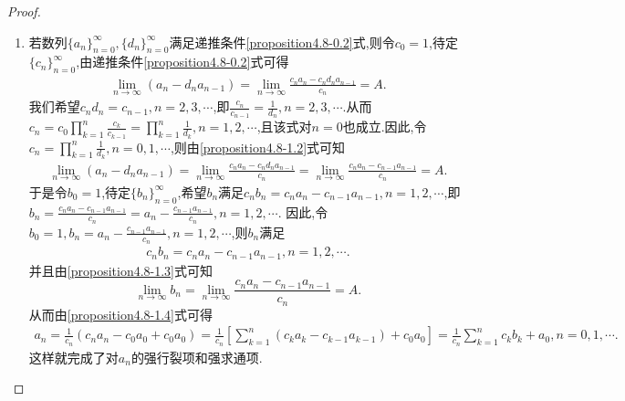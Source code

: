 \documentclass[../../main.tex]{subfiles}%
\begin{document}
\begin{proof}
\begin{enumerate}[(1)]
\item 若数列\(\{ a_n \}_{n = 0}^{\infty}, \{ d_n \}_{n = 0}^{\infty}\)满足递推条件\eqref{proposition4.8-0.2}式,则令\(c_0 = 1\),待定\(\{ c_n \}_{n = 0}^{\infty}\),由递推条件\eqref{proposition4.8-0.2}式可得
\begin{align}\label{proposition4.8-1.2}
\lim_{n\rightarrow \infty}(a_n - d_na_{n - 1}) = \lim_{n\rightarrow \infty}\frac{c_na_n - c_nd_na_{n - 1}}{c_n} = A. 
\end{align}
我们希望\(c_nd_n = c_{n - 1}, n = 2, 3, \cdots\),即\(\frac{c_n}{c_{n - 1}} = \frac{1}{d_n}, n = 2, 3, \cdots\).从而\(c_n = c_0\prod_{k = 1}^n{\frac{c_k}{c_{k - 1}}} = \prod_{k = 1}^n{\frac{1}{d_k}}, n = 1, 2, \cdots\),且该式对\(n = 0\)也成立.因此,令\(c_n = \prod_{k = 1}^n{\frac{1}{d_k}}, n = 0, 1, \cdots\),则由\eqref{proposition4.8-1.2}式可知
\begin{align}\label{proposition4.8-1.3}
\lim_{n\rightarrow \infty}(a_n - d_na_{n - 1}) = \lim_{n\rightarrow \infty}\frac{c_na_n - c_nd_na_{n - 1}}{c_n} = \lim_{n\rightarrow \infty}\frac{c_na_n - c_{n - 1}a_{n - 1}}{c_n} = A.
\end{align}
于是令\(b_0 = 1\),待定\(\{ b_n \}_{n = 0}^{\infty}\),希望\(b_n\)满足\(c_nb_n = c_na_n - c_{n - 1}a_{n - 1}, n = 1, 2, \cdots\),即\(b_n = \frac{c_na_n - c_{n - 1}a_{n - 1}}{c_n} = a_n - \frac{c_{n - 1}a_{n - 1}}{c_n}, n = 1, 2, \cdots\).
因此,令\(b_0 = 1, b_n = a_n - \frac{c_{n - 1}a_{n - 1}}{c_n}, n = 1, 2, \cdots\),则\(b_n\)满足
\begin{align}\label{proposition4.8-1.4}
c_nb_n = c_na_n - c_{n - 1}a_{n - 1}, n = 1, 2, \cdots.
\end{align}
并且由\eqref{proposition4.8-1.3}式可知
\[
\lim_{n\rightarrow \infty}b_n = \lim_{n\rightarrow \infty}\frac{c_na_n - c_{n - 1}a_{n - 1}}{c_n} = A.
\]
从而由\eqref{proposition4.8-1.4}式可得
\begin{align*}
a_n = \frac{1}{c_n}(c_na_n - c_0a_0 + c_0a_0)
= \frac{1}{c_n}\left[ \sum_{k = 1}^n{(c_ka_k - c_{k - 1}a_{k - 1})} + c_0a_0 \right]
= \frac{1}{c_n}\sum_{k = 1}^n{c_kb_k} + a_0, n = 0, 1, \cdots.
\end{align*}
这样就完成了对\(a_n\)的强行裂项和强求通项.
\end{enumerate}

\end{proof}
\end{document}

